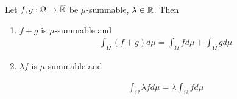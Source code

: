 \begin{thm}[] \label{thm:linearity-integral}
  Let $f,g: \Omega\to \overline{\mathbb{R}}$ be $\mu$-summable, $\lambda \in \mathbb{R}$. Then
  \begin{enumerate}
    \item $f+g$ is $\mu$-summable and
  \begin{align*}
    \int_{\Omega}(f + g) d \mu 
    =
    \int_{\Omega} f d \mu + \int_{\Omega} g d \mu 
  \end{align*}
  \item $\lambda f$ is $\mu$-summable and
      
  \begin{align*}
    \int_{\Omega} \lambda f d \mu
    =
    \lambda \int_{\Omega} f d \mu
  \end{align*}
\end{enumerate}
\end{thm}
